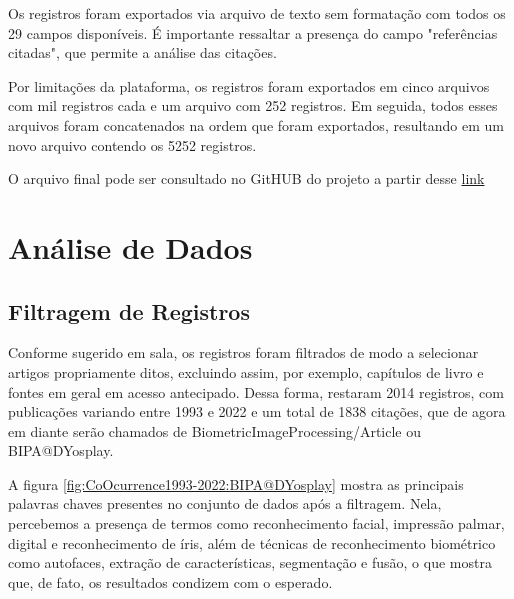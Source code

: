 Os registros foram exportados via arquivo de texto sem formatação com todos os 29 campos disponíveis. É importante ressaltar a presença do campo "referências citadas", que permite a análise das citações.

Por limitações da plataforma, os registros foram exportados em cinco arquivos com mil registros cada e um arquivo com 252 registros. Em seguida, todos esses arquivos foram concatenados na ordem que foram exportados, resultando em um novo arquivo contendo os 5252 registros.

O arquivo final pode ser consultado no GitHUB do projeto a partir desse \href{https://github.com/jhcf/Comput-Experim-20212/tree/main/experiments/DYosplay/PesquisaBibliometrica/Registros}{link} 

\section{Análise de Dados}

\subsection{Filtragem de Registros}

Conforme sugerido em sala, os registros foram filtrados de modo a selecionar artigos propriamente ditos, excluindo assim, por exemplo, capítulos de livro e fontes em geral em acesso antecipado. Dessa forma, restaram 2014 registros, com publicações variando entre 1993 e 2022 e um total de 1838 citações, que de agora em diante serão chamados de BiometricImageProcessing/Article ou BIPA@DYosplay.

A figura \ref{fig:CoOcurrence1993-2022:BIPA@DYosplay} mostra as principais palavras chaves presentes no conjunto de dados após a filtragem. Nela, percebemos a presença de termos como reconhecimento facial, impressão palmar, digital e reconhecimento de íris, além de técnicas de reconhecimento biométrico como autofaces, extração de características, segmentação e fusão, o que mostra que, de fato, os resultados condizem com o esperado.

